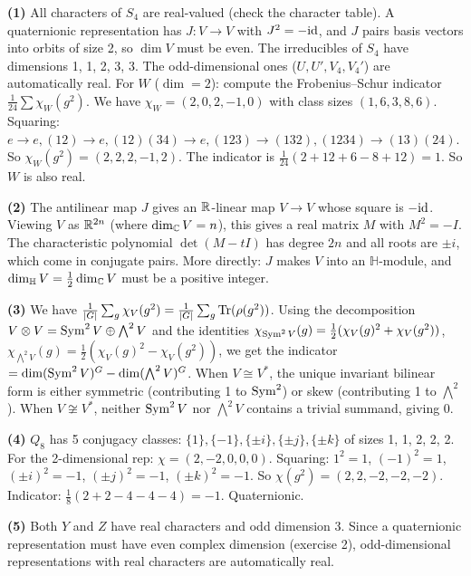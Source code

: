 \documentclass{report}
\begin{document}
\begin{solution}
\textbf{(1)} All characters of \(S_4\) are real-valued (check the character table). A quaternionic representation has \(J : V \to V\) with \(J^2 = -\text{id}\), and \(J\) pairs basis vectors into orbits of size 2, so \(\dim V\) must be even. The irreducibles of \(S_4\) have dimensions 1, 1, 2, 3, 3. The odd-dimensional ones (\(U, U', V_4, V_4'\)) are automatically real. For \(W\) (\(\dim = 2\)): compute the Frobenius--Schur indicator \(\frac{1}{24}\sum \chi_W(g^2)\). We have \(\chi_W = (2, 0, 2, -1, 0)\) with class sizes \((1, 6, 3, 8, 6)\). Squaring: \(e \to e, (12) \to e, (12)(34) \to e, (123) \to (132), (1234) \to (13)(24)\). So \(\chi_W(g^2) = (2, 2, 2, -1, 2)\). The indicator is \(\frac{1}{24}(2 + 12 + 6 - 8 + 12) = 1\). So \(W\) is also real.

\textbf{(2)} The antilinear map \(J\) gives an \({\RR}\)-linear map \(V \to V\) whose square is \(-\text{id}\). Viewing \(V\) as \({\RR}^{2n}\) (where \(\dim_{\CC} V = n\)), this gives a real matrix \(M\) with \(M^2 = -I\). The characteristic polynomial \(\det(M - tI)\) has degree \(2n\) and all roots are \(\pm i\), which come in conjugate pairs. More directly: \(J\) makes \(V\) into an \(\mathbb{H}\)-module, and \(\dim_\mathbb{H} V = \frac{1}{2}\dim_{\CC} V\) must be a positive integer.

\textbf{(3)} We have \(\frac{1}{|G|}\sum_g \chi_V(g^2) = \frac{1}{|G|}\sum_g \operatorname{Tr}(\rho(g^2))\). Using the decomposition \(V \otimes V = \operatorname{Sym}^2 V \oplus \bigwedge^2 V\) and the identities \(\chi_{\operatorname{Sym}^2 V}(g) = \frac{1}{2}(\chi_V(g)^2 + \chi_V(g^2))\), \(\chi_{\bigwedge^2 V}(g) = \frac{1}{2}(\chi_V(g)^2 - \chi_V(g^2))\), we get the indicator \(= \dim(\operatorname{Sym}^2 V)^G - \dim(\bigwedge^2 V)^G\). When \(V \cong V^*\), the unique invariant bilinear form is either symmetric (contributing 1 to \(\operatorname{Sym}^2\)) or skew (contributing 1 to \(\bigwedge^2\)). When \(V \not\cong V^*\), neither \(\operatorname{Sym}^2 V\) nor \(\bigwedge^2 V\) contains a trivial summand, giving 0.

\textbf{(4)} \(Q_8\) has 5 conjugacy classes: \(\{1\}, \{-1\}, \{\pm i\}, \{\pm j\}, \{\pm k\}\) of sizes 1, 1, 2, 2, 2. For the 2-dimensional rep: \(\chi = (2, -2, 0, 0, 0)\). Squaring: \(1^2 = 1\), \((-1)^2 = 1\), \((\pm i)^2 = -1\), \((\pm j)^2 = -1\), \((\pm k)^2 = -1\). So \(\chi(g^2) = (2, 2, -2, -2, -2)\). Indicator: \(\frac{1}{8}(2 + 2 - 4 - 4 - 4) = -1\). Quaternionic.

\textbf{(5)} Both \(Y\) and \(Z\) have real characters and odd dimension 3. Since a quaternionic representation must have even complex dimension (exercise 2), odd-dimensional representations with real characters are automatically real.
\end{solution}
\end{document}

